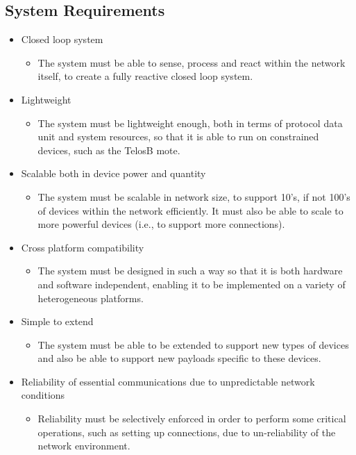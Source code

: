 \subsection{System Requirements} %
\label{sub:system_requirements}
\begin{itemize}
	\item Closed loop system
	\begin{itemize}
		\item The system must be able to sense, process and react within the network itself, to create a fully reactive closed loop system.
	\end{itemize}
	\item Lightweight
	\begin{itemize}
		\item The system must be lightweight enough, both in terms of protocol data unit and system resources, so that it is able to run on constrained devices, such as the TelosB mote.
	\end{itemize}
	\item Scalable both in device power and quantity
	\begin{itemize}
		\item The system must be scalable in network size, to support 10's, if not 100's of devices within the network efficiently. It must also be able to scale to more powerful devices (i.e., to support more connections).
	\end{itemize}
	\item Cross platform compatibility
	\begin{itemize}
		\item The system must be designed in such a way so that it is both hardware and software independent, enabling it to be implemented on a variety of heterogeneous platforms.
	\end{itemize}
	\item Simple to extend
	\begin{itemize}
		\item The system must be able to be extended to support new types of devices and also be able to support new payloads specific to these devices.
	\end{itemize}
	\item Reliability of essential communications due to unpredictable network conditions
	\begin{itemize}
		\item Reliability must be selectively enforced in order to perform some critical operations, such as setting up connections, due to un-reliability of the network environment.

\end{itemize}
\end{itemize}
